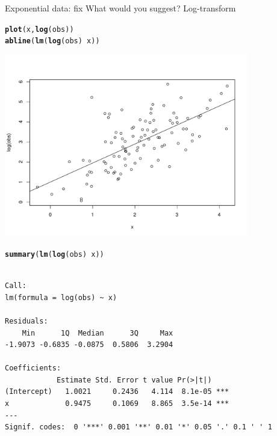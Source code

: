 \documentclass[10pt]{beamer}\usepackage[]{graphicx}\usepackage[]{color}
\makeatletter
\newcommand{\hlopt}[1]{\textcolor[rgb]{0,0,0}{#1}}%
\newcommand{\hlstd}[1]{\textcolor[rgb]{0.345,0.345,0.345}{#1}}%
\newcommand{\hlkwd}[1]{\textcolor[rgb]{0.737,0.353,0.396}{\textbf{#1}}}%
\newenvironment{kframe}{%
 \def\at@end@of@kframe{}%
 \ifinner\ifhmode%
  \def\at@end@of@kframe{\end{minipage}}%
  \begin{minipage}{\columnwidth}%
 \fi\fi%
 \def\FrameCommand##1{\hskip\@totalleftmargin \hskip-\fboxsep
 \colorbox{shadecolor}{##1}\hskip-\fboxsep
     \hskip-\linewidth \hskip-\@totalleftmargin \hskip\columnwidth}%
 \MakeFramed {\advance\hsize-\width
   \@totalleftmargin\z@ \linewidth\hsize
   \@setminipage}}%
 {\par\unskip\endMakeFramed%
 \at@end@of@kframe}
\newenvironment{knitrout}{}{} %
\makeatother
\begin{document}
\begin{frame}[fragile]{Exponential data: fix}
What would you suggest?
\pause
Log-transform
\begin{knitrout}
\color{fgcolor}\begin{kframe}
\begin{alltt}
\hlkwd{plot}\hlstd{(x,} \hlkwd{log}\hlstd{(obs))}
\hlkwd{abline}\hlstd{(}\hlkwd{lm}\hlstd{(}\hlkwd{log}\hlstd{(obs)} \hlopt{~} \hlstd{x))}
\end{alltt}
\end{kframe}
\includegraphics[width=0.8\textwidth,height=0.6\textwidth]{figure/unnamed-chunk-25-1} 
\begin{kframe}\begin{alltt}
\hlkwd{summary}\hlstd{(}\hlkwd{lm}\hlstd{(}\hlkwd{log}\hlstd{(obs)} \hlopt{~} \hlstd{x))}
\end{alltt}
\begin{verbatim}

Call:
lm(formula = log(obs) ~ x)

Residuals:
    Min      1Q  Median      3Q     Max 
-1.9073 -0.6835 -0.0875  0.5806  3.2904 

Coefficients:
            Estimate Std. Error t value Pr(>|t|)    
(Intercept)   1.0021     0.2436   4.114  8.1e-05 ***
x             0.9475     0.1069   8.865  3.5e-14 ***
---
Signif. codes:  0 '***' 0.001 '**' 0.01 '*' 0.05 '.' 0.1 ' ' 1


\end{verbatim}
\end{kframe}
\end{knitrout}
\end{frame}
\end{document}
